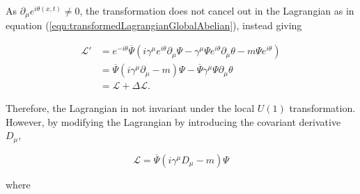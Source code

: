 \documentclass{article}
\begin{document}
As $\partial_\mu e^{i\theta(x,t)}\neq 0$, the transformation does not cancel out in the Lagrangian as in equation (\ref{eqn:transformedLagrangianGlobalAbelian}), instead giving

\begin{equation}
\begin{split}
\mathcal{L'} &= e^{-i\theta}\overline{\Psi}(i \gamma^\mu e^{i\theta} \partial_\mu \Psi -\gamma^\mu \Psi e^{i\theta} \partial_\mu \theta - m\Psi e^{i\theta}) \\
&=\overline{\Psi}(i\gamma^\mu \partial_\mu - m)\Psi - \overline{\Psi}\gamma^\mu\Psi \partial_\mu \theta \\
&= \mathcal{L} + \Delta \mathcal{L}.
\end{split}
\end{equation}

Therefore, the Lagrangian in not invariant under the local $U(1)$ transformation. However, by modifying the Lagrangian by introducing the covariant derivative $D_\mu$,

\begin{equation}
\mathcal{L} = \overline{\Psi}(i\gamma^\mu D_\mu -m)\Psi
\end{equation}

where 
\end{document}
